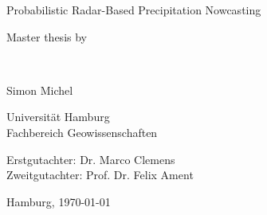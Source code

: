 \documentclass[11pt,twoside,a4paper,fleqn,x11names]{report}
\numberwithin{equation}{chapter}
\numberwithin{figure}{chapter}
\numberwithin{table}{chapter}
\begin{document}
	\thispagestyle{empty}
	\begin{center}
		\hspace*{0pt}\vfill
		\begin{Huge}
			Probabilistic Radar-Based Precipitation Nowcasting
		\end{Huge}
		\vfill
		\begin{minipage}{0.5\textwidth}
			\centering
				\begin{large}
					Master thesis by
				\end{large}
				\\\vspace{0.5cm}
				\begin{huge}
					Simon Michel
				\end{huge}
		\end{minipage}
		\vfill
		
		\begin{minipage}{0.5\textwidth}
			\centering
				\begin{large}
					Universität Hamburg\\
					Fachbereich Geowissenschaften
				\end{large}
		\end{minipage}
		\vfill
		
		\begin{minipage}{0.5\textwidth}
			\centering
				\begin{large}
					Erstgutachter: Dr. Marco Clemens\\
					Zweitgutachter: Prof. Dr. Felix Ament
				\end{large}
		\end{minipage}
		\vfill
		\begin{minipage}{0.5\textwidth}
			\centering
				\begin{large}
					Hamburg, \today
				\end{large}
		\end{minipage}
		\vfill
	\end{center}
	
\end{document}
